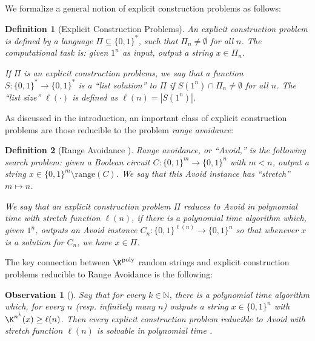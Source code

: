 \documentclass[11pt]{article}
\newtheorem{definition}{Definition}
\newtheorem{observation}{Observation}
\newcommand{\B}{\{0,1\}}
\renewcommand{\poly}{\mathrm{poly}}
\begin{document}
We formalize a general notion of explicit construction problems as follows: 
\begin{definition}[Explicit Construction Problems]
An explicit construction problem is defined by a language $\Pi \subseteq \B^*$, such that $\Pi_n \neq \emptyset$ for all $n$. The computational task is: given $1^n$ as input, output a string $x \in \Pi_n$.

If $\Pi$ is an explicit construction problems, we say that a function $S: \B^* \to \B^*$ is a ``list solution'' to $\Pi$ if $S(1^n) \cap \Pi_n \neq \emptyset$ for all $n$. The ``list size'' $\ell(\cdot)$ is defined as $\ell(n) = |S(1^n)|$.
\end{definition}
As discussed in the introduction, an important class of explicit construction problems are those reducible to the problem \emph{range avoidance}:
\begin{definition}[Range Avoidance \cite{KKMP21,Korten21,RSW22}]
Range avoidance, or ``Avoid,'' is the following search problem: given a Boolean circuit $C: \B^m\to \B^n$ with $m < n$, output a string $x\in \B^m \setminus \mathrm{range}(C)$. We say that this Avoid instance has ``stretch'' $m \mapsto n$.

We say that an explicit construction problem $\Pi$ reduces to Avoid in polynomial time with stretch function $\ell(n)$, if there is a polynomial time algorithm which, given $1^n$, outputs an Avoid instance $C_n: \B^{\ell(n)} \to \B^n$ so that whenever $x $ is a solution for $C_n$, we have $x \in \Pi$. 
\end{definition}
The key connection between $\K^{\poly}$ random strings and explicit construction problems reducible to Range Avoidance is the following:
\begin{observation}[\cite{RSW22}]\label{obs:avoid-to-random-strings}
Say that for every $k \in \mathbb{N}$, there is a polynomial time algorithm which, for every $n$ (resp. infinitely many $n$) outputs a string $x \in \B^n$ with $\K^{n^k}(x) \geq \ell(n)$. Then every explicit construction problem reducible to Avoid with stretch function $\ell(n)$ is solvable in polynomial time .
\end{observation}
\end{document}
